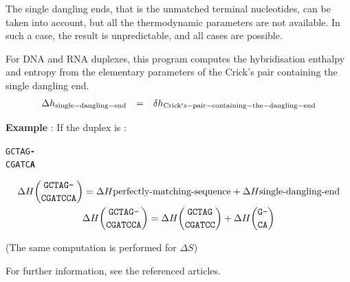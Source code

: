 \documentclass{article}
\begin{document}
The single dangling ends, that is the unmatched terminal nucleotides, can be taken into
account, but all the thermodynamic parameters are not available. In such a case, 
the result is unpredictable, and all cases are possible. 

For DNA and RNA duplexes, this program computes the hybridisation enthalpy and entropy from the elementary 
parameters of the Crick's pair containing the single dangling end. 
\begin{displaymath}
  \begin{array}[t]{ccc}
  \Delta{}h_\mathrm{single-dangling-end}&=&\delta{}h_\mathrm{Crick's-pair-containing-the-dangling-end}\\
  \end{array}
\end{displaymath}

\textbf{Example} :
If the duplex is :
\begin{alltt}
GCTAG\textbf{-}
CGATC\textbf{A}
\end{alltt}
\begin{multline*}
\Delta H {\mbox{\texttt{GCTAG-}} \choose \mbox{\texttt{CGATCCA}}} =
\Delta H {\mbox{perfectly-matching-sequence}} +
\Delta H {\mbox{single-dangling-end}} \\
\Delta H {\mbox{\texttt{GCTAG-}} \choose \mbox{\texttt{CGATCCA}}} =
\Delta H {\mbox{\texttt{GCTAG}} \choose \mbox{\texttt{CGATCC}}} +
\Delta H {\mbox{\texttt{G-}} \choose \mbox{\texttt{CA}}} \\
\end{multline*}


       (The same computation is performed for $\Delta S$)

For further information, see the referenced articles.
\end{document}
